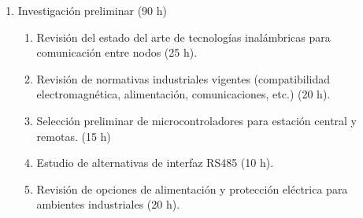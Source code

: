 \documentclass[
11pt, %
]{charter}
\begin{document}
\begin{enumerate}
	\item Investigación preliminar (90 h)
	\begin{enumerate}
		\item Revisión del estado del arte de tecnologías inalámbricas para comunicación entre nodos (25 h).
		\item Revisión de normativas industriales vigentes (compatibilidad electromagnética, alimentación, comunicaciones, etc.) (20 h).
		\item Selección preliminar de microcontroladores para estación central y remotas. (15 h)
		\item Estudio de alternativas de interfaz RS485 (10 h).
		\item Revisión de opciones de alimentación y protección eléctrica para ambientes industriales (20 h).
	\end{enumerate}
	

\end{enumerate}
\end{document}
